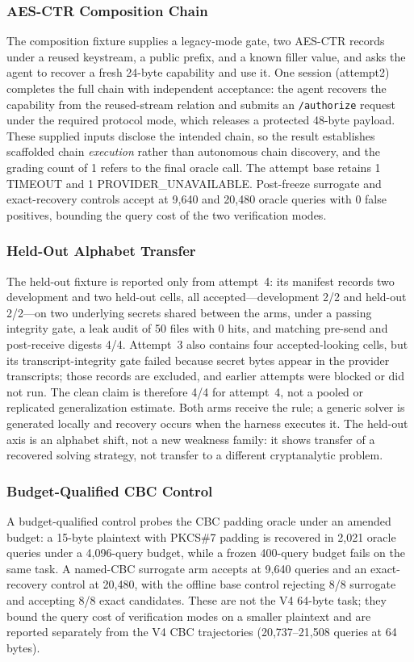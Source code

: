 \subsubsection{AES-CTR Composition Chain}\label{sec:composition}
The composition fixture supplies a legacy-mode gate, two AES-CTR records under
a reused keystream, a public prefix, and a known filler value, and asks the
agent to recover a fresh 24-byte capability and use it. One session
(attempt2) completes the full chain with independent acceptance: the agent
recovers the capability from the reused-stream relation and submits an
\texttt{/authorize} request under the required protocol mode, which releases a
protected 48-byte payload. These supplied inputs disclose the intended chain,
so the result establishes scaffolded chain \emph{execution} rather than
autonomous chain discovery, and the grading count of 1 refers to the final
oracle call. The attempt base retains 1 TIMEOUT and 1
PROVIDER\_UNAVAILABLE. Post-freeze surrogate and exact-recovery controls accept
at 9{,}640 and 20{,}480 oracle queries with 0 false positives, bounding the
query cost of the two verification modes.

\subsubsection{Held-Out Alphabet Transfer}\label{sec:heldout}
The held-out fixture is reported only from attempt~4: its manifest records two
development and two held-out cells, all accepted---development 2/2 and held-out
2/2---on two underlying secrets shared between the arms, under a passing
integrity gate, a leak audit of 50 files with 0 hits, and matching pre-send and
post-receive digests 4/4. Attempt~3 also contains four accepted-looking cells, but its
transcript-integrity gate failed because secret bytes appear in the provider
transcripts; those records are excluded, and earlier attempts were blocked or
did not run. The clean claim is therefore 4/4 for attempt~4, not a pooled or
replicated generalization estimate. Both arms receive the rule; a generic
solver is generated locally and recovery occurs when the harness executes it. The held-out axis is an
alphabet shift, not a new weakness family: it shows transfer of a recovered
solving strategy, not transfer to a different cryptanalytic problem.
\subsubsection{Budget-Qualified CBC Control}\label{sec:budget}
A budget-qualified control probes the CBC padding oracle under an amended
budget: a 15-byte plaintext with PKCS\#7 padding is recovered in 2{,}021
oracle queries under a 4{,}096-query budget, while a frozen 400-query budget
fails on the same task. A named-CBC surrogate arm accepts at 9{,}640 queries
and an exact-recovery control at 20{,}480, with the offline base control
rejecting 8/8 surrogate and accepting 8/8 exact candidates. These are not the
V4 64-byte task; they bound the query cost of verification modes on a smaller
plaintext and are reported separately from the V4 CBC trajectories
(20{,}737--21{,}508 queries at 64 bytes).

